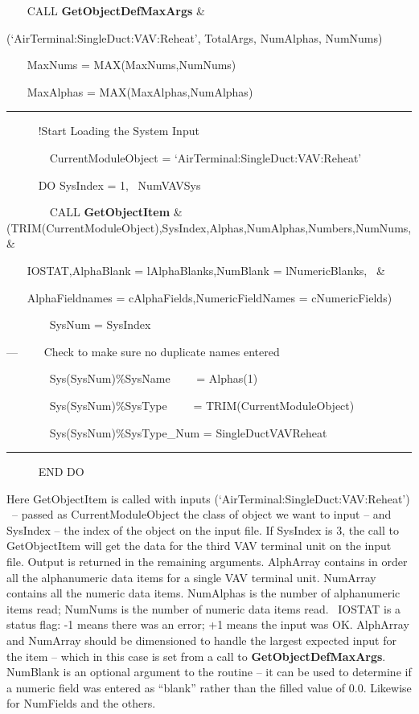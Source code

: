 ~~~ CALL \textbf{GetObjectDefMaxArgs} \&

(`AirTerminal:SingleDuct:VAV:Reheat', TotalArgs, NumAlphas, NumNums)

~~~ MaxNums = MAX(MaxNums,NumNums)

~~~ MaxAlphas = MAX(MaxAlphas,NumAlphas)

\begin{center}\rule{0.5\linewidth}{\linethickness}\end{center}

~~~~~ !Start Loading the System Input

~~~~~~~ CurrentModuleObject = `AirTerminal:SingleDuct:VAV:Reheat'

~~~~~ DO SysIndex = 1,~ NumVAVSys

~~~~~~~ CALL \textbf{GetObjectItem} \& (TRIM(CurrentModuleObject),SysIndex,Alphas,NumAlphas,Numbers,NumNums, \&

~~~ IOSTAT,AlphaBlank = lAlphaBlanks,NumBlank = lNumericBlanks,~ \&

~~~ AlphaFieldnames = cAlphaFields,NumericFieldNames = cNumericFields)

~~~~~~~ SysNum = SysIndex

---~~~~ Check to make sure no duplicate names entered

~~~~~~~ Sys(SysNum)\%SysName~~~~ = Alphas(1)

~~~~~~~ Sys(SysNum)\%SysType~~~~ = TRIM(CurrentModuleObject)

~~~ ~~~~Sys(SysNum)\%SysType\_Num = SingleDuctVAVReheat

\begin{center}\rule{0.5\linewidth}{\linethickness}\end{center}

~~~~~ END DO

Here GetObjectItem is called with inputs (`AirTerminal:SingleDuct:VAV:Reheat') ~-- passed as CurrentModuleObject the class of object we want to input -- and SysIndex -- the index of the object on the input file. If SysIndex is 3, the call to GetObjectItem will get the data for the third VAV terminal unit on the input file. Output is returned in the remaining arguments. AlphArray contains in order all the alphanumeric data items for a single VAV terminal unit. NumArray contains all the numeric data items. NumAlphas is the number of alphanumeric items read; NumNums is the number of numeric data items read.~ IOSTAT is a status flag: -1 means there was an error; +1 means the input was OK. AlphArray and NumArray should be dimensioned to handle the largest expected input for the item -- which in this case is set from a call to \textbf{GetObjectDefMaxArgs}. NumBlank is an optional argument to the routine -- it can be used to determine if a numeric field was entered as ``blank'' rather than the filled value of 0.0. Likewise for NumFields and the others.

